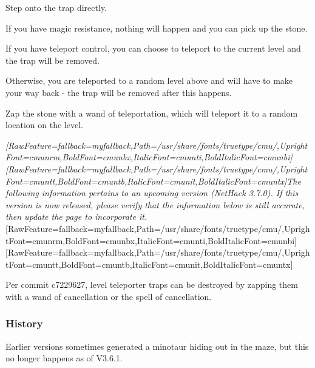\begin{myitemize}\item{}Step onto the trap directly.

\begin{myitemize}\item{}If you have magic resistance, nothing will happen and you can pick up the stone.
\item{}If you have teleport control, you can choose to teleport to the current level and the trap will be removed.
\item{}Otherwise, you are teleported to a random level above and will have to make your way back -{} the trap will be removed after this happens.
\end{myitemize}

\item{}Zap the stone with a wand of teleportation, which will teleport it to a random location on the level.
\end{myitemize}

{\itshape \allowbreak{}\setmainfont{cmunti.ttf}[RawFeature={fallback=myfallback},Path=/usr/share/fonts/truetype/cmu/,UprightFont=cmunrm,BoldFont=cmunbx,ItalicFont=cmunti,BoldItalicFont=cmunbi]\setmonofont{cmunti.ttf}[RawFeature={fallback=myfallback},Path=/usr/share/fonts/truetype/cmu/,UprightFont=cmuntt,BoldFont=cmuntb,ItalicFont=cmunit,BoldItalicFont=cmuntx]\itshape The following information pertains to an upcoming version (NetHack 3.7.0\footnotemark[126]). If this version is now released, please verify that the information below is still accurate, then update the page to incorporate it.}\allowbreak{}\setmainfont{cmunrm.ttf}[RawFeature={fallback=myfallback},Path=/usr/share/fonts/truetype/cmu/,UprightFont=cmunrm,BoldFont=cmunbx,ItalicFont=cmunti,BoldItalicFont=cmunbi]\setmonofont{cmunrm.ttf}[RawFeature={fallback=myfallback},Path=/usr/share/fonts/truetype/cmu/,UprightFont=cmuntt,BoldFont=cmuntb,ItalicFont=cmunit,BoldItalicFont=cmuntx]

Per commit c7229627, level teleporter traps can be destroyed by zapping them with a wand of cancellation or the spell of cancellation.
\subsubsection{History}
\label{6}
Earlier versions sometimes generated a minotaur hiding out in the maze, but this no longer happens as of V3.6.1.
